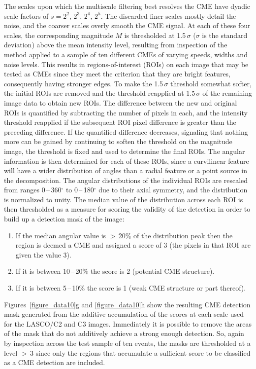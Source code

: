 \documentclass[preprint2]{aastex}
\begin{document}
The scales upon which the multiscale filtering best resolves the CME have dyadic scale factors of $s=2^{2},\,2^{3},\,2^{4},\,2^{5}$. The discarded finer scales mostly detail the noise, and the coarser scales overly smooth the CME signal. At each of these four scales, the corresponding magnitude $M$ is thresholded at 1.5\,$\sigma$ ($\sigma$ is the standard deviation) above the mean intensity level, resulting from inspection of the method applied to a sample of ten different CMEs of varying speeds, widths and noise levels. This results in regions-of-interest (ROIs) on each image that may be tested as CMEs since they meet the criterion that they are bright features, consequently having stronger edges. To make the 1.5\,$\sigma$ threshold somewhat softer, the initial ROIs are removed and the threshold reapplied at 1.5\,$\sigma$ of the remaining image data to obtain new ROIs. The difference between the new and original ROIs is quantified by subtracting the number of pixels in each, and the intensity threshold reapplied if the subsequent ROI pixel difference is greater than the preceding difference. If the quantified difference decreases, signaling that nothing more can be gained by continuing to soften the threshold on the magnitude image, the threshold is fixed and used to determine the final ROIs. The angular information is then determined for each of these ROIs, since a curvilinear feature will have a wider distribution of angles than a radial feature or a point source in the decomposition. The angular distributions of the individual ROIs are rescaled from ranges 0\,--\,360$^{\circ}$ to 0\,--\,180$^{\circ}$ due to their axial symmetry, and the distribution is normalized to unity. The median value of the distribution across each ROI is then thresholded as a measure for scoring the validity of the detection in order to build up a detection mask of the image:
\begin{enumerate}
\item If the median angular value is $>$\,20\% of the distribution peak then the region is deemed a CME and assigned a score of 3 (the pixels in that ROI are given the value 3).
\item If it is between 10\,--\,20\% the score is 2 (potential CME structure).
\item If it is between 5\,--\,10\% the score is 1 (weak CME structure or part thereof).
\end{enumerate}
Figures~\ref{figure_data10}g and \ref{figure_data10}h show the resulting CME detection mask generated from the additive accumulation of the scores at each scale used for the LASCO/C2 and C3 images. Immediately it is possible to remove the areas of the mask that do not additively achieve a strong enough detection. So, again by inspection across the test sample of ten events, the masks are thresholded at a level $>$\,3 since only the regions that accumulate a sufficient score to be classified as a CME detection are included.
\end{document}
